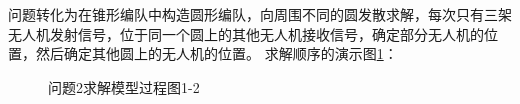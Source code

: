 \documentclass[12pt]{ctexart}
\begin{document}
\begin{spacing}{1.5}
问题转化为在锥形编队中构造圆形编队，向周围不同的圆发散求解，每次只有三架无人机发射信号，位于同一个圆上的其他无人机接收信号，确定部分无人机的位置，然后确定其他圆上的无人机的位置。
求解顺序的演示图\ref{tu13}：

\begin{figure}[H]
	\caption{问题2求解模型过程图1-2}
	\label{tu13}
\end{figure}


\end{spacing}
\end{document}
